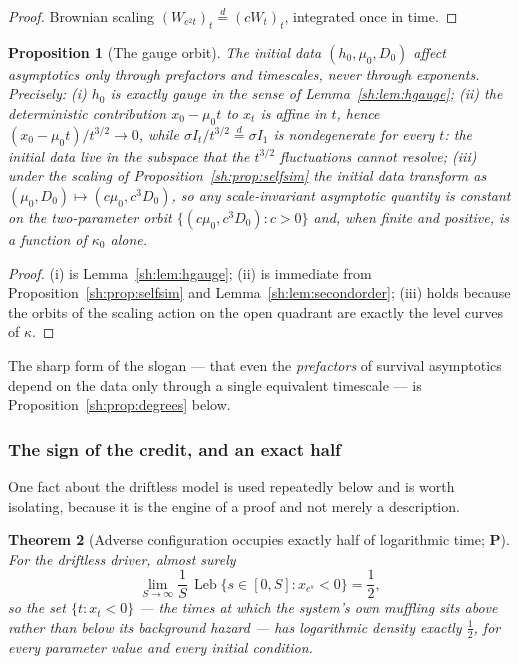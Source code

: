 \documentclass[11pt]{article}
\numberwithin{equation}{section}
\theoremstyle{plain}
\newtheorem{theorem}{Theorem}[section]
\newtheorem{proposition}[theorem]{Proposition}
\theoremstyle{definition}
\theoremstyle{remark}
\DeclareMathOperator{\Leb}{Leb}
\newcommand{\eqd}{\overset{d}{=}}
\begin{document}
\begin{proof}
Brownian scaling $(W_{c^2t})_t\eqd(cW_t)_t$, integrated once in time.
\end{proof}

\begin{proposition}[The gauge orbit]\label{sh:prop:gauge}
The initial data $(h_0,\mu_0,D_0)$ affect asymptotics only through
prefactors and timescales, never through exponents. Precisely:
\emph{(i)} $h_0$ is exactly gauge in the sense of
Lemma~\ref{sh:lem:hgauge};
\emph{(ii)} the deterministic contribution
$x_0-\mu_0t$ to $x_t$ is affine in $t$, hence
$(x_0-\mu_0t)/t^{3/2}\to0$, while $\sigma I_t/t^{3/2}\eqd\sigma I_1$ is
nondegenerate for every $t$: the initial data live in the subspace that the
$t^{3/2}$ fluctuations cannot resolve;
\emph{(iii)} under the scaling of Proposition~\ref{sh:prop:selfsim} the
initial data transform as $(\mu_0,D_0)\mapsto(c\mu_0,c^3D_0)$, so any
scale-invariant asymptotic quantity is constant on the two-parameter orbit
$\{(c\mu_0,c^3D_0):c>0\}$ and, when finite and positive, is a function of
$\kappa_0$ alone.
\end{proposition}

\begin{proof}
(i) is Lemma~\ref{sh:lem:hgauge}; (ii) is immediate from
Proposition~\ref{sh:prop:selfsim} and Lemma~\ref{sh:lem:secondorder};
(iii) holds because the orbits of the scaling action on the open quadrant
are exactly the level curves of $\kappa$.
\end{proof}

The sharp form of the slogan --- that even the \emph{prefactors} of survival
asymptotics depend on the data only through a single equivalent timescale ---
is Proposition~\ref{sh:prop:degrees} below.

\subsubsection{The sign of the credit, and an exact half}
\label{gr1:subsub:sign}

One fact about the driftless model is used repeatedly below and is worth
isolating, because it is the engine of a proof and not merely a
description.

\begin{theorem}[Adverse configuration occupies exactly half of
logarithmic time; \textbf{P}]\label{tc:thm:half}
For the driftless driver, almost surely
\begin{equation}\label{tc:eq:half}
\lim_{S\to\infty}\frac1S\,\Leb\bigl\{s\in[0,S]:x_{e^{s}}<0\bigr\}
=\frac12 ,
\end{equation}
so the set $\{t:x_t<0\}$ --- the times at which the system's own
muffling sits \emph{above} rather than below its background hazard ---
has logarithmic density exactly $\tfrac12$, for every parameter value
and every initial condition.
\end{theorem}
\end{document}
